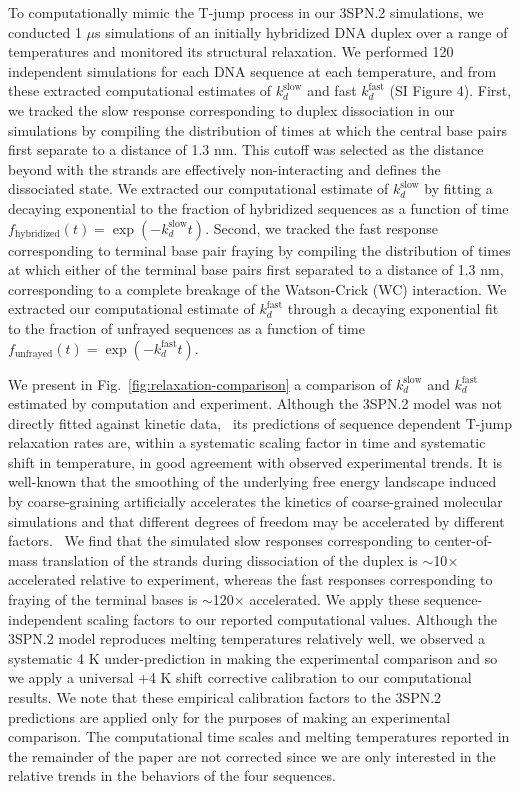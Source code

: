 \documentclass[journal=jpcbfk,manuscript=article]{achemso}
\begin{document}
To computationally mimic the T-jump process in our 3SPN.2 simulations, we conducted 1 $\mu$s simulations of an initially hybridized DNA duplex over a range of temperatures and monitored its structural relaxation. We performed 120 independent simulations for each DNA sequence at each temperature, and from these extracted computational estimates of $k_d^\mathrm{slow}$ and fast $k_d^\mathrm{fast}$ (SI Figure 4). First, we tracked the slow response corresponding to duplex dissociation in our simulations by compiling the distribution of times at which the central base pairs first separate to a distance of 1.3 nm. This cutoff was selected as the distance beyond with the strands are effectively non-interacting and defines the dissociated state. We extracted our computational estimate of $k_d^\mathrm{slow}$ by fitting a decaying exponential to the fraction of hybridized sequences as a function of time $f_\mathrm{hybridized}(t) = \exp(-k_d^\mathrm{slow}t)$. Second, we tracked the fast response corresponding to terminal base pair fraying by compiling the distribution of times at which either of the terminal base pairs first separated to a distance of 1.3 nm, corresponding to a complete breakage of the Watson-Crick (WC) interaction. We extracted our computational estimate of $k_d^\mathrm{fast}$ through a decaying exponential fit to the fraction of unfrayed sequences as a function of time $f_\mathrm{unfrayed}(t) = \exp(-k_d^\mathrm{fast}t)$. 

We present in Fig.~\ref{fig:relaxation-comparison} a comparison of $k_d^\mathrm{slow}$ and $k_d^\mathrm{fast}$ estimated by computation and experiment. Although the 3SPN.2 model was not directly fitted against kinetic data,~\cite{Hinckley2013AnHybridization} its predictions of sequence dependent T-jump relaxation rates are, within a systematic scaling factor in time and systematic shift in temperature, in good agreement with observed experimental trends. It is well-known that the smoothing of the underlying free energy landscape induced by coarse-graining artificially accelerates the kinetics of coarse-grained molecular simulations and that different degrees of freedom may be accelerated by different factors.~\citep{Marrink2007TheSimulations, Fritz2011MultiscaleDynamics, Marrink2013PerspectiveModel} We find that the simulated slow responses corresponding to center-of-mass translation of the strands during dissociation of the duplex is $\sim$10$\times$ accelerated relative to experiment, whereas the fast responses corresponding to fraying of the terminal bases is $\sim$120$\times$ accelerated. We apply these sequence-independent scaling factors to our reported computational values. Although the 3SPN.2 model reproduces melting temperatures relatively well, we observed a systematic 4 K under-prediction in making the experimental comparison and so we apply a universal +4 K shift corrective calibration to our computational results. We note that these empirical calibration factors to the 3SPN.2 predictions are applied only for the purposes of making an experimental comparison. The computational time scales and melting temperatures reported in the remainder of the paper are not corrected since we are only interested in the relative trends in the behaviors of the four sequences.
\end{document}
